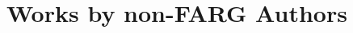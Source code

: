 \documentclass{article}
\begin{document}
\section*{Works by non-FARG Authors}
\nocite{schank+abelson1977}
\nocite{schank1982}
\nocite{Kanerva}
\nocite{Minsky}
\nocite{Agar}
\nocite{Arnheim, Neisser, Lakoff, Clark}
\nocite{SimonKotovsky, Persson, Kuhn}



\end{document}
